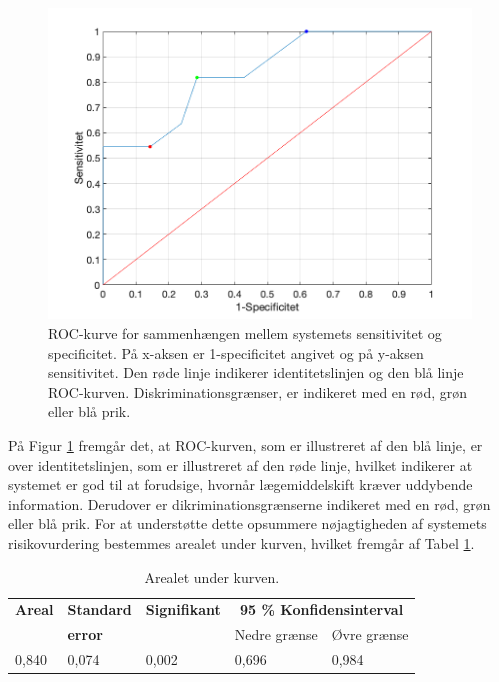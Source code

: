 \begin{figure}[H]\centering
\includegraphics[width=1\textwidth]{billeder/ROC11.png} 
	\caption{ROC-kurve for sammenhængen mellem systemets sensitivitet og specificitet. På x-aksen er 1-specificitet angivet og på y-aksen sensitivitet. Den røde linje indikerer identitetslinjen og den blå linje ROC-kurven. Diskriminationsgrænser, er indikeret med en rød, grøn eller blå prik.}
	\label{fig:ROC}  
\end{figure}

På Figur \ref{fig:ROC} fremgår det, at ROC-kurven, som er illustreret af den blå linje, er over identitetslinjen, som er illustreret af den røde linje, hvilket indikerer at systemet er god til at forudsige, hvornår lægemiddelskift kræver uddybende information. Derudover er dikriminationsgrænserne indikeret med en rød, grøn eller blå prik. For at understøtte dette opsummere nøjagtigheden af systemets risikovurdering bestemmes arealet under kurven, hvilket fremgår af Tabel \ref{table:AUC}.

\begin{table}[H]
\caption{Arealet under kurven.}
\label{table:AUC}
\centering
\begin{tabular}{l|l|l|l|l}
 \rowcolor[HTML]{C0C0C0} \textbf{Areal}  &  \textbf{Standard}                       & \textbf{Signifikant} &
 \multicolumn{2}{c}{\textbf{95 \% Konfidensinterval}}  \\ 
  \rowcolor[HTML]{C0C0C0}                                                          & \textbf{error} &  & Nedre grænse      & Øvre grænse    \\ \hline
0,840 & 0,074 & 0,002 & 0,696 & 0,984 \\ \hline
\end{tabular}
\end{table}
\vspace{0.2cm}

